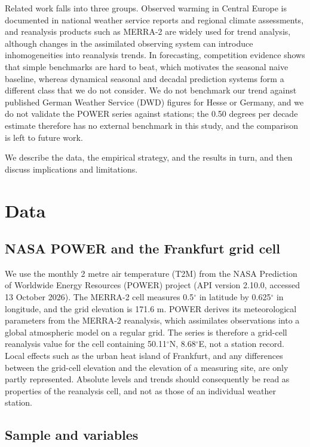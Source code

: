 \documentclass[11pt]{article}
\begin{document}
Related work falls into three groups. Observed warming in Central Europe is documented in national weather service reports and regional climate assessments, and reanalysis products such as MERRA-2 are widely used for trend analysis, although changes in the assimilated observing system can introduce inhomogeneities into reanalysis trends. In forecasting, competition evidence shows that simple benchmarks are hard to beat, which motivates the seasonal naive baseline, whereas dynamical seasonal and decadal prediction systems form a different class that we do not consider. We do not benchmark our trend against published German Weather Service (DWD) figures for Hesse or Germany, and we do not validate the POWER series against stations; the 0.50 degrees per decade estimate therefore has no external benchmark in this study, and the comparison is left to future work.

We describe the data, the empirical strategy, and the results in turn, and then discuss implications and limitations.

\section{Data}

\subsection{NASA POWER and the Frankfurt grid cell}

We use the monthly 2 metre air temperature (T2M) from the NASA Prediction of Worldwide Energy Resources (POWER) project \citep{NASA_POWER} (API version 2.10.0, accessed 13 October 2026). The MERRA-2 cell measures 0.5$^\circ$ in latitude by 0.625$^\circ$ in longitude, and the grid elevation is 171.6 m. POWER derives its meteorological parameters from the MERRA-2 reanalysis, which assimilates observations into a global atmospheric model on a regular grid. The series is therefore a grid-cell reanalysis value for the cell containing 50.11$^\circ$N, 8.68$^\circ$E, not a station record. Local effects such as the urban heat island of Frankfurt, and any differences between the grid-cell elevation and the elevation of a measuring site, are only partly represented. Absolute levels and trends should consequently be read as properties of the reanalysis cell, and not as those of an individual weather station.

\subsection{Sample and variables}
\end{document}
